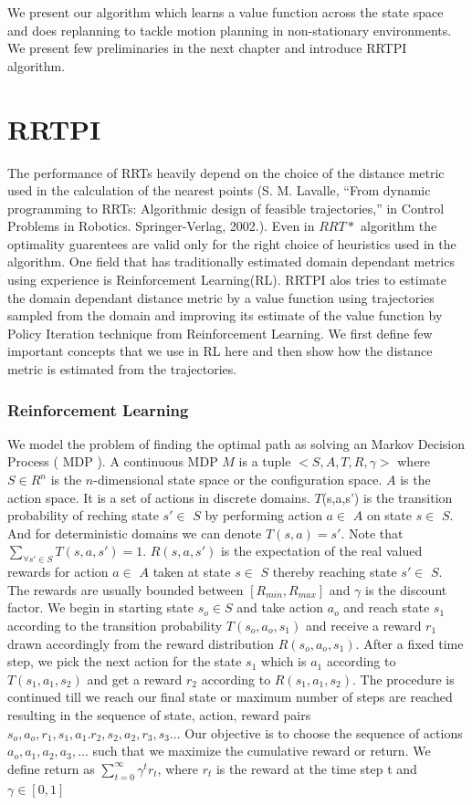 \documentclass[MTech]{iitmdiss}
\begin{document}
We present our algorithm which learns a value function across the state space and does replanning to tackle motion planning in non-stationary environments. We present few preliminaries in the next chapter and introduce RRTPI algorithm.
 
 
\chapter{RRTPI}

The performance of RRTs heavily depend on the choice of the distance metric used in the calculation of the nearest points (S. M. Lavalle, “From dynamic programming to RRTs: Algorithmic design of feasible trajectories,” in Control Problems in Robotics.
Springer-Verlag, 2002.). Even in $RRT*$ algorithm the optimality guarentees are valid only for the right choice of heuristics used in the algorithm. One field that has traditionally estimated domain dependant metrics using experience is Reinforcement Learning(RL). RRTPI alos tries to estimate the domain dependant distance metric by a value function using trajectories sampled from the domain and improving its estimate of the value function by Policy Iteration technique from Reinforcement Learning. We first define few important concepts that we use in RL here and then show how the distance metric is estimated from the trajectories. 

\subsection{Reinforcement Learning}

We model the problem of finding the optimal path as solving an Markov Decision Process ( MDP ). A continuous MDP $M$ is a tuple $<S,A,T,R,\gamma>$ where $S \in R^{n}$ is the $n$-dimensional state space or the configuration space. $A$ is the action space. It is a set of actions in discrete domains. $T$(s,a,s') is the transition probability of reching state  $s' \in$ $S$ by performing action  $a \in$ $A$ on state  $s \in$ $S$. And for deterministic domains we can denote $T(s,a) = s'$. Note that 
$\sum_{\forall s' \in S } T(s,a,s') = 1$. $R(s,a,s')$ is the expectation of the real valued rewards for action  $a \in$ $A$  taken at state $s \in$ $S$ thereby reaching  state $s' \in$ $S$. The rewards are usually bounded between $[R_{min}, R_{max}]$ and $\gamma $ is the discount factor.
We begin in starting state $s_o \in S$ and take action $a_o$ and reach state $s_1$ according to the transition probability $T(s_o,a_o,s_1)$ and receive a reward $r_1$ drawn accordingly from the reward distribution $R(s_o, a_o, s_1)$. After a fixed time step, we pick the next action for the state $s_1$ which is $a_1$ according to $T(s_1, a_1, s_2)$ and get a reward $r_2$ according to $R(s_1, a_1, s_2)$. The procedure is continued till we reach our final state or maximum number of steps are reached resulting in the sequence of state, action, reward pairs $s_o, a_o,r_1, s_1,a_1.r_2,s_2, a_2,r_3,s_3... $ Our objective is to choose the sequence of actions $a_o, a_1, a_2 , a_3, ...$ such that we maximize the cumulative reward or return. We define return as $\displaystyle \sum_{t=0}^{\infty} \gamma^t r_t$, where $r_t $ is the reward at the time step t and $\gamma \in [0,1]$ 
\end{document}
